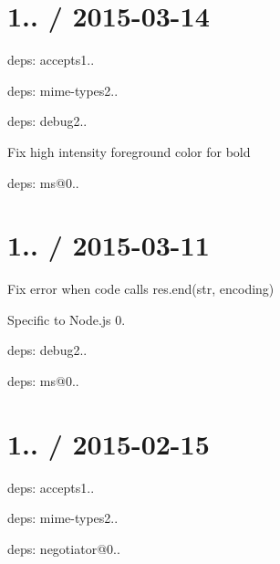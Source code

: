 \section*{1.. / 2015-\/03-\/14 }


\begin{DoxyItemize}
\item deps\+: accepts1..
\begin{DoxyItemize}
\item deps\+: mime-\/types2..
\end{DoxyItemize}
\item deps\+: debug2..
\begin{DoxyItemize}
\item Fix high intensity foreground color for bold
\item deps\+: ms@0..
\end{DoxyItemize}
\end{DoxyItemize}

\section*{1.. / 2015-\/03-\/11 }


\begin{DoxyItemize}
\item Fix error when code calls {\ttfamily res.\+end(str, encoding)}
\begin{DoxyItemize}
\item Specific to Node.\+js 0.
\end{DoxyItemize}
\item deps\+: debug2..
\begin{DoxyItemize}
\item deps\+: ms@0..
\end{DoxyItemize}
\end{DoxyItemize}

\section*{1.. / 2015-\/02-\/15 }


\begin{DoxyItemize}
\item deps\+: accepts1..
\begin{DoxyItemize}
\item deps\+: mime-\/types2..
\item deps\+: negotiator@0..
\end{DoxyItemize}
\end{DoxyItemize}

